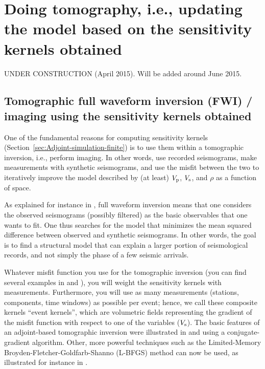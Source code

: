 \chapter[Doing tomography based on the sensitivity kernels obtained]{Doing tomography, i.e., updating the model based on the sensitivity kernels obtained}\label{cha:tomo}

UNDER CONSTRUCTION (April 2015). Will be added around June 2015.

\section{Tomographic full waveform inversion (FWI) / imaging using the sensitivity kernels obtained}

One of the fundamental reasons for computing sensitivity kernels (Section~\ref{sec:Adjoint-simulation-finite})
is to use them within a tomographic inversion, i.e., perform imaging. In other words, use
recorded seismograms, make measurements with synthetic seismograms,
and use the misfit between the two to iteratively improve the model
described by (at least) $V_{{\rm p}}$, $V_{{\rm s}}$, and $\rho$ as a function of space.

As explained for instance in \cite{MoChKoWa15},
full waveform inversion means that one considers the observed seismograms (possibly filtered) as the
basic observables that one wants to fit. One thus searches for the model that minimizes the mean squared difference between observed
and synthetic seismograms. In other words, the goal is to find a structural model that can explain a larger portion
of seismological records, and not simply the phase of a few seismic arrivals.

Whatever misfit function you use for the tomographic inversion (you can find several
examples in \citet{TrKoLi08} and \citet{TrTaLi05}), you will weight
the sensitivity kernels with measurements. Furthermore, you will use
as many measurements (stations, components, time windows) as possible
per event; hence, we call these composite kernels ``event kernels'',
which are volumetric fields representing the gradient of the misfit
function with respect to one of the variables (\eg $V_{{\rm s}}$).
The basic features of an adjoint-based tomographic inversion were
illustrated in \citet{TrKoLi08} and \citet{TaLiTr07} using a conjugate-gradient algorithm.
Other, more powerful techniques such as the Limited-Memory Broyden-Fletcher-Goldfarb-Shanno (L-BFGS) method can now be used,
as illustrated for instance in \cite{MoChKoWa15}.


